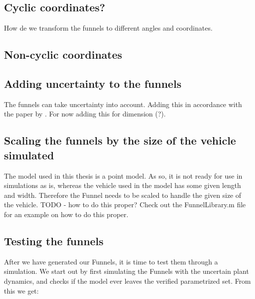 \subsection{Cyclic coordinates?}

How de we transform the funnels to different angles and coordinates.

\subsection{Non-cyclic coordinates}

\subsection{Adding uncertainty to the funnels}

The funnels can take uncertainty into account. Adding this in accordance with
the paper by \cite{majumedar2013}. For now adding this for dimension (?).

\subsection{Scaling the funnels by the size of the vehicle simulated}

The model used in this thesis is a point model. As so, it is not ready for use
in simulations as is, whereas the vehicle used in the model has some given
length and width. Therefore the Funnel needs to be scaled to handle the given
size of the vehicle. TODO - how to do this proper? Check out the FunnelLibrary.m
file for an example on how to do this proper.

\subsection{Testing the funnels}

After we have generated our Funnels, it is time to test them through a
simulation. We start out by first simulating the Funnels with the uncertain
plant dynamics, and checks if the model ever leaves the verified parametrized
set. From this we get:

